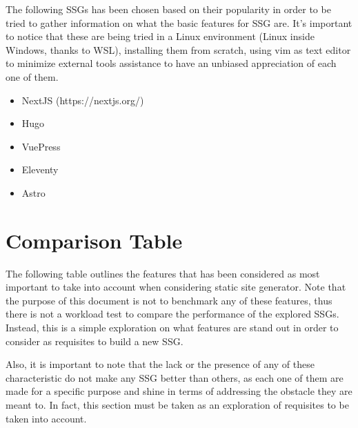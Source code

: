 \documentclass[12pt]{report}
\begin{document}
    The following SSGs has been chosen based on their popularity in order
    to be tried to gather information on what the basic features for SSG
    are.
    It's important to notice that these are being tried in a Linux environment
    (Linux inside Windows, thanks to WSL), installing them from scratch, using vim
    as text editor to minimize external tools assistance to have an unbiased appreciation
    of each one of them.

    \begin{itemize}
        \item NextJS (https://nextjs.org/)
        \item Hugo\cite{hugo}
        \item VuePress
        \item Eleventy
        \item Astro
    \end{itemize}







    \section{Comparison Table}\label{sec:comparison-table}


    The following table outlines the features that has been considered as most important to take into account when
    considering static site generator.
    Note that the purpose of this document is not to benchmark any of these features,
    thus there is not a workload test to compare the performance of the explored SSGs. Instead, this is a simple
    exploration on what features are stand out in order to consider as requisites to build a new SSG.


    Also, it is important to note that the lack or the presence of any of these characteristic do not make any SSG
    better
    than others, as each one of them are made for a specific purpose and shine in terms of addressing the obstacle
    they are meant to\cite{khalid}.
    In fact, this section must be taken as an exploration of requisites to be taken into account.
\end{document}
